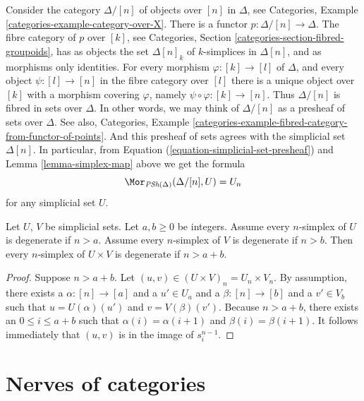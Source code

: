 \begin{example}
\label{example-simplex-category}
Consider the category $\Delta/[n]$ of objects over $[n]$
in $\Delta$, see
Categories, Example \ref{categories-example-category-over-X}.
There is a functor $p : \Delta/[n] \to \Delta$.
The fibre category of $p$ over $[k]$, see
Categories, Section \ref{categories-section-fibred-groupoids},
has as objects the
set $\Delta[n]_k$ of $k$-simplices in $\Delta[n]$, and as
morphisms only identities. For every morphism
$\varphi : [k] \to [l]$ of $\Delta$, and every object $\psi : [l] \to [n]$
in the fibre category over $[l]$ there is a unique
object over $[k]$ with a morphism covering $\varphi$, namely
$\psi \circ \varphi : [k] \to [n]$. Thus $\Delta/[n]$
is fibred in sets over $\Delta$. In other words, we may
think of $\Delta/[n]$ as a presheaf of sets over $\Delta$.
See also, Categories,
Example \ref{categories-example-fibred-category-from-functor-of-points}.
And this presheaf of sets agrees with the simplicial set
$\Delta[n]$. In particular, from Equation
(\ref{equation-simplicial-set-presheaf}) and
Lemma \ref{lemma-simplex-map} above
we get the formula
$$
\Mor_{\textit{PSh}(\Delta)}(\Delta/[n], U) = U_n
$$
for any simplicial set $U$.
\end{example}

\begin{lemma}
\label{lemma-product-degenerate}
Let $U$, $V$ be simplicial sets.
Let $a, b \geq 0$ be integers.
Assume every $n$-simplex of $U$ is degenerate if $n > a$.
Assume every $n$-simplex of $V$ is degenerate if $n > b$.
Then every $n$-simplex of $U \times V$ is degenerate
if $n > a + b$.
\end{lemma}

\begin{proof}
Suppose $n > a + b$. Let $(u, v) \in (U \times V)_n = U_n \times V_n$.
By assumption, there exists a $\alpha : [n] \to [a]$ and a
$u' \in U_a$ and a $\beta : [n] \to [b]$ and a $v' \in V_b$
such that $u = U(\alpha)(u')$ and $v = V(\beta)(v')$. Because
$n > a + b$, there exists an $0 \leq i \leq a + b$ such that
$\alpha(i) = \alpha(i + 1)$ and
$\beta(i) = \beta(i + 1)$. It follows immediately
that $(u, v)$ is in the image of $s^{n - 1}_i$.
\end{proof}



\section{Nerves of categories}
\label{section-nerves-categories}

